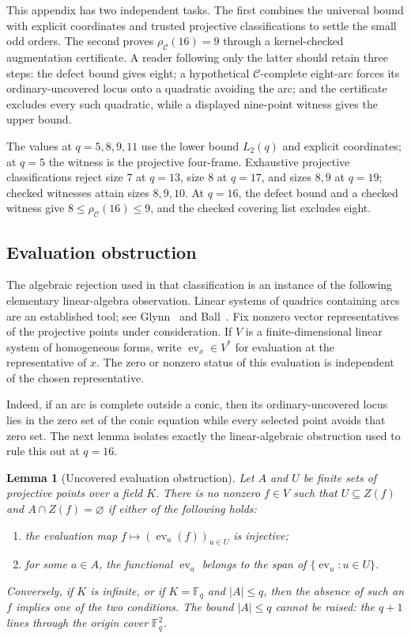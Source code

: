 \documentclass[11pt]{article}
\newtheorem{lemma}[theorem]{Lemma}
\theoremstyle{definition}
\theoremstyle{remark}
\newcommand{\F}{\mathbb{F}}
\newcommand{\cC}{\mathcal{C}}
\newcommand{\rhoC}{\rho_{\cC}}
\begin{document}
This appendix has two independent tasks.  The first combines the universal
bound with explicit coordinates and trusted projective classifications to
settle the small odd orders.  The second proves \(\rhoC(16)=9\) through a
kernel-checked augmentation certificate.  A reader following only the latter
should retain three steps: the defect bound gives eight; a hypothetical
\(\cC\)-complete eight-arc forces its ordinary-uncovered locus onto a
quadratic avoiding the arc; and the certificate excludes every such
quadratic, while a displayed nine-point witness gives the upper bound.

The values at $q=5,8,9,11$ use the lower bound $L_2(q)$ and explicit
coordinates; at $q=5$ the witness is the projective four-frame.  Exhaustive
projective classifications reject size $7$ at $q=13$, size $8$ at $q=17$,
and sizes $8,9$ at $q=19$; checked witnesses attain sizes $8,9,10$.  At
$q=16$, the defect bound and a checked witness give
$8\le\rhoC(16)\le9$, and the checked covering list excludes eight.

\subsection{Evaluation obstruction}

The algebraic rejection used in that classification is an instance of the
following elementary linear-algebra observation.  Linear systems of
quadrics containing arcs are an established tool; see Glynn~\cite{Glynn1994}
and Ball~\cite{Ball2017Quadrics}.  Fix nonzero vector representatives of the
projective points under consideration.  If $V$ is a finite-dimensional
linear system of homogeneous forms, write
$\operatorname{ev}_x\in V^*$ for evaluation at the representative of $x$.
The zero or nonzero status of this evaluation is independent of the chosen
representative.

Indeed, if an arc is complete outside a conic, then its ordinary-uncovered
locus lies in the zero set of the conic equation while every selected point
avoids that zero set.  The next lemma isolates exactly the linear-algebraic
obstruction used to rule this out at $q=16$.

\begin{lemma}[Uncovered evaluation obstruction]
\label{lem:evaluation-obstruction}
Let $A$ and $U$ be finite sets of projective points over a field $K$.
There is no nonzero $f\in V$ such that $U\subseteq Z(f)$ and
$A\cap Z(f)=\varnothing$ if either of the following holds:
\begin{enumerate}
 \item the evaluation map
 $f\mapsto(\operatorname{ev}_u(f))_{u\in U}$ is injective;
 \item for some $a\in A$, the functional $\operatorname{ev}_a$ belongs to
 the span of $\{\operatorname{ev}_u:u\in U\}$.
\end{enumerate}
Conversely, if $K$ is infinite, or if $K=\F_q$ and $|A|\le q$, then the
absence of such an $f$ implies one of the two conditions.  The bound
$|A|\le q$ cannot be raised: the $q+1$ lines through the origin cover
$\F_q^2$.
\end{lemma}
\end{document}
